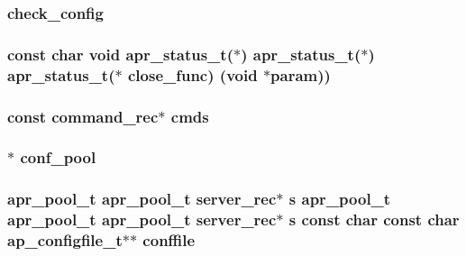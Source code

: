 \subsubsection[{\texorpdfstring{check\+\_\+config}{check_config}}]{\setlength{\rightskip}{0pt plus 5cm}check\+\_\+config}\hypertarget{group__APACHE__CORE__CONFIG_ga316c6f6f0fb0da985adf0a1620cc9acc}{}\label{group__APACHE__CORE__CONFIG_ga316c6f6f0fb0da985adf0a1620cc9acc}
\subsubsection[{\texorpdfstring{close\+\_\+func}{close_func}}]{\setlength{\rightskip}{0pt plus 5cm}const char {\bf void} {\bf apr\+\_\+status\+\_\+t}($\ast$) {\bf apr\+\_\+status\+\_\+t}($\ast$) {\bf apr\+\_\+status\+\_\+t}($\ast$ close\+\_\+func) ({\bf void} $\ast${\bf param}))}\hypertarget{group__APACHE__CORE__CONFIG_ga36deff347cb59bd8dabf131dcb9e437b}{}\label{group__APACHE__CORE__CONFIG_ga36deff347cb59bd8dabf131dcb9e437b}
\subsubsection[{\texorpdfstring{cmds}{cmds}}]{\setlength{\rightskip}{0pt plus 5cm}const {\bf command\+\_\+rec}$\ast$ cmds}\hypertarget{group__APACHE__CORE__CONFIG_ga276fa352432845f2429eef18a78881ec}{}\label{group__APACHE__CORE__CONFIG_ga276fa352432845f2429eef18a78881ec}
\subsubsection[{\texorpdfstring{conf\+\_\+pool}{conf_pool}}]{$\ast$ conf\+\_\+pool}\hypertarget{group__APACHE__CORE__CONFIG_gaec639b1fb5a5702becc4208ed53096b0}{}\label{group__APACHE__CORE__CONFIG_gaec639b1fb5a5702becc4208ed53096b0}
\subsubsection[{\texorpdfstring{conffile}{conffile}}]{ {\bf apr\+\_\+pool\+\_\+t} {\bf apr\+\_\+pool\+\_\+t} {\bf server\+\_\+rec}$\ast$ {\bf s} {\bf apr\+\_\+pool\+\_\+t} {\bf apr\+\_\+pool\+\_\+t} {\bf apr\+\_\+pool\+\_\+t} {\bf server\+\_\+rec}$\ast$ {\bf s} const char const char {\bf ap\+\_\+configfile\+\_\+t}$\ast$$\ast$ conffile}\hypertarget{group__APACHE__CORE__CONFIG_ga5c104ddcdad0e51eb352b18901acb19a}{}\label{group__APACHE__CORE__CONFIG_ga5c104ddcdad0e51eb352b18901acb19a}
